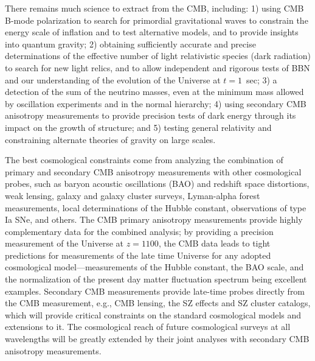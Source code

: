 There remains much science to extract from the CMB, including: 1) using CMB B-mode polarization to search for primordial gravitational waves to constrain the energy scale of inflation and to test alternative models, and to provide insights into quantum gravity; 2) obtaining sufficiently accurate and precise determinations of the effective number of light relativistic species (dark radiation) to search for new light relics, and to allow independent and rigorous tests of BBN and our understanding of the evolution of the Universe at $t = 1$\ sec; 3) a detection of the sum of the neutrino masses, even at the minimum mass allowed by oscillation experiments and in the normal hierarchy; 4) using secondary CMB anisotropy measurements to provide precision tests of dark energy through its impact on the growth of structure; and 5) testing general relativity and constraining alternate theories of gravity on large scales.

The best cosmological constraints come from analyzing the combination of primary and secondary CMB anisotropy measurements with other cosmological probes, such as baryon acoustic oscillations (BAO) and redshift space distortions, weak lensing, galaxy and galaxy cluster surveys, Lyman-alpha forest measurements, local determinations of the Hubble constant, observations of type Ia SNe, and others. The CMB primary anisotropy measurements provide highly complementary data for the combined analysis;  by providing a precision measurement of the Universe at $z = 1100$, the CMB data leads to tight predictions for measurements of the late time Universe for any adopted cosmological model---measurements of the Hubble constant, the BAO scale, and the normalization of the present day matter fluctuation spectrum being excellent examples. Secondary CMB measurements provide late-time probes directly from the CMB measurement, e.g., CMB lensing, the SZ effects and SZ cluster catalogs, which will provide critical constraints on the standard cosmological models and extensions to it. The cosmological reach of future cosmological surveys at all wavelengths will be greatly extended by their joint analyses with secondary CMB anisotropy measurements. 


